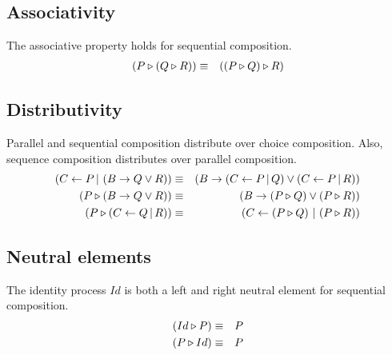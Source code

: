 \vspace*{-0.75em}
\subsection{Associativity}
\vspace*{-0.75em}
The associative property holds for sequential composition.
\begin{eqnarray*}
  \left( P \triangleright \left( Q \triangleright R \right) \right) & \equiv & \left( \left( P \triangleright Q \right) \triangleright R \right)
\end{eqnarray*}

\vspace*{-0.75em}
\subsection{Distributivity}
\vspace*{-0.75em}
Parallel and sequential composition distribute over choice composition. Also, sequence composition distributes over parallel composition.
\begin{eqnarray*}
  \left( C \gets P \, | \, \left( B \to Q \vee R \right) \right) & \equiv & \left( B \to \left( C \gets P \, | \, Q \right) \vee \left( C \gets P \, | \, R \right) \right) \\
  \left( P \triangleright \left( B \to Q \vee R \right) \right) & \equiv & \left( B \to \left( P \triangleright Q \right) \vee \left( P \triangleright R \right) \right) \\
  \left( P \triangleright \left( C \gets Q \, | \, R \right) \right) & \equiv & \left( C \gets \left( P \triangleright Q \right) \, | \, \left( P \triangleright R \right) \right)
\end{eqnarray*}

\vspace*{-0.75em}
\subsection{Neutral elements}
\vspace*{-0.75em}
The identity process $Id$ is both a left and right neutral element for sequential composition.
\vspace*{-1em}
\begin{eqnarray*}
  \left( Id \triangleright P \right) & \equiv & P \\
  \left( P \triangleright Id \right) & \equiv & P
\end{eqnarray*}

\vspace*{-0.75em}
